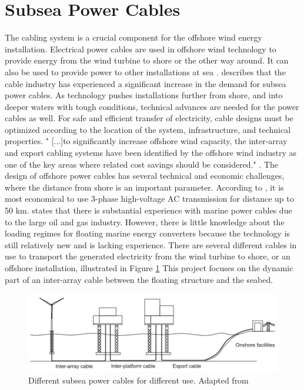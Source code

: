 \section{Subsea Power Cables}
 The cabling system is a crucial component for the offshore wind energy installation. Electrical power cables are used in offshore wind technology to provide energy from the wind turbine to shore or the other way around. It can also be used to provide power to other installations at sea \cite{Nasution2013}.  \cite{srinil2016} describes that the cable industry has experienced a significant increase in the demand for subsea power cables. As technology pushes installations further from shore, and into deeper waters with tough conditions, technical advances are needed for the power cables as well. For safe and efficient transfer of electricity, cable designs must be optimized according to the location of the system, infrastructure, and technical properties. " [...]to significantly increase offshore wind capacity, the inter-array and export cabling systems have been identified by the offshore wind industry as one of the key areas where related cost savings should be considered."  \cite{srinil2016}. The design of offshore power cables has several technical and economic challenges, where the distance from shore is an important parameter. According to \cite{Lynn2011}, it is most economical to use 3-phase high-voltage AC transmission for distance up to 50 km.\newline
 \newline
 \cite{Thies2012} states that there is substantial experience with marine power cables due to the large oil and gas industry. However, there is little knowledge about the loading regimes for floating marine energy converters because the technology is still relatively new and is lacking experience. 
 \newline
 \newline
 There are several different cables in use to transport the generated electricity from the wind turbine to shore, or an offshore installation, illustrated in Figure \ref{fig:diffcable} This project focuses on the dynamic part of an inter-array cable between the floating structure and the seabed. 
 
 \begin{figure}[H]
\centering
\includegraphics[scale=0.8]{figures/diffcable}
\caption[$\; \:$Different subsea power cables]{Different subsea power cables for different use. Adapted from   \cite{srinil2016} }
 \label{fig:diffcable}
\end{figure}

